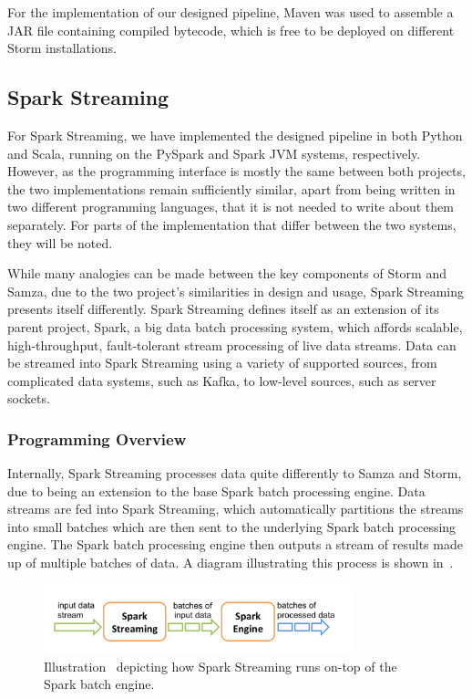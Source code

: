 For the implementation of our designed pipeline, Maven was used to assemble a JAR file containing compiled bytecode, which
is free to be deployed on different Storm installations.



\subsection{Spark Streaming} %
\label{ssub:impl_spark_streaming}

For Spark Streaming, we have implemented the designed pipeline in both Python and Scala, running on the PySpark and Spark
JVM systems, respectively. However, as the programming interface is mostly the same between both projects, the two
implementations remain sufficiently similar, apart from being written in two different programming languages, that it is
not needed to write about them separately. For parts of the implementation that differ between the two systems, they
will be noted.

While many analogies can be made between the key components of Storm and Samza, due to the two project's similarities in design and
usage, Spark Streaming presents itself differently. Spark Streaming defines itself as an extension of its parent project,
Spark, a big data batch processing system, which affords scalable, high-throughput, fault-tolerant stream processing of
live data streams. Data can be streamed into Spark Streaming using a variety of supported sources, from complicated data
systems, such as Kafka, to low-level sources, such as server sockets.

\subsubsection{Programming Overview}

Internally, Spark Streaming processes data quite differently to Samza and Storm, due to being an extension to the base
Spark batch processing engine. Data streams are fed into Spark Streaming, which automatically partitions the streams into
small batches which are then sent to the underlying Spark batch processing engine. The Spark batch processing engine then
outputs a stream of results made up of multiple batches of data. A diagram illustrating this process is shown in~.

\begin{figure}[H]
  \centering
  \includegraphics[width=0.8\textwidth]{includes/figures/fig_spark_layout}
  \caption{Illustration~\cite{Spark_doc_fig} depicting how Spark Streaming runs on-top of the Spark batch engine.}
  \label{fig:spark_stream_batch}
\end{figure}

